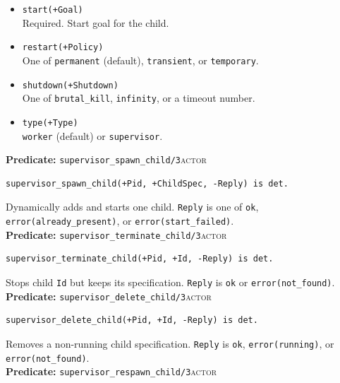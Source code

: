 \begin{itemize}
\item
  \texttt{start(+Goal)}\\
  Required. Start goal for the child.
\item
  \texttt{restart(+Policy)}\\
  One of \texttt{permanent} (default), \texttt{transient}, or
  \texttt{temporary}.
\item
  \texttt{shutdown(+Shutdown)}\\
  One of \texttt{brutal\_kill}, \texttt{infinity}, or a timeout number.
\item
  \texttt{type(+Type)}\\
  \texttt{worker} (default) or \texttt{supervisor}.
\end{itemize}

\bigskip
\noindent \textbf{Predicate:} \texttt{supervisor\_spawn\_child/3}\hfill\textsc{actor}

\begin{verbatim}
supervisor_spawn_child(+Pid, +ChildSpec, -Reply) is det.
\end{verbatim}

\noindent Dynamically adds and starts one child. \texttt{Reply} is one of
\texttt{ok}, \texttt{error(already\_present)}, or
\texttt{error(start\_failed)}.\\

\bigskip
\noindent \textbf{Predicate:} \texttt{supervisor\_terminate\_child/3}\hfill\textsc{actor}

\begin{verbatim}
supervisor_terminate_child(+Pid, +Id, -Reply) is det.
\end{verbatim}

\noindent Stops child \texttt{Id} but keeps its specification. \texttt{Reply}
is \texttt{ok} or \texttt{error(not\_found)}.\\

\bigskip
\noindent \textbf{Predicate:} \texttt{supervisor\_delete\_child/3}\hfill\textsc{actor}

\begin{verbatim}
supervisor_delete_child(+Pid, +Id, -Reply) is det.
\end{verbatim}

\noindent Removes a non-running child specification. \texttt{Reply} is
\texttt{ok}, \texttt{error(running)}, or \texttt{error(not\_found)}.\\

\bigskip
\noindent \textbf{Predicate:} \texttt{supervisor\_respawn\_child/3}\hfill\textsc{actor}

